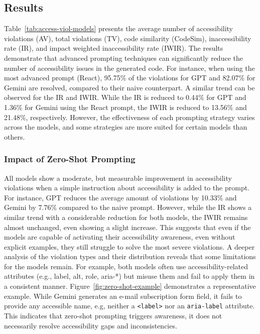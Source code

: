 \subsection{Results}
Table~\ref{tab:access-viol-models} presents the average number of accessibility 
violations (AV), total violations (TV), code similarity (CodeSim),
inaccessibility rate (IR), and impact weighted inaccessibility rate (IWIR).
The results demonstrate that advanced prompting techniques can significantly
reduce the number of accessibility issues in the generated code. For instance,
when using the most advanced prompt (React), 95.75\% of the violations for 
GPT and 82.07\% for Gemini are resolved, compared to their naive counterpart.
A similar trend can be observed for the IR and IWIR. While the 
IR is reduced to 0.44\% for GPT and 1.36\% for Gemini using the React 
prompt, the IWIR is reduced to 13.56\% and 21.48\%, respectively. However, 
the effectiveness of each prompting strategy varies across the models, and 
some strategies are more suited for certain models than others.


\begingroup
    
\endgroup

\subsubsection{Impact of Zero-Shot Prompting}
All models show a moderate, but measurable improvement in accessibility 
violations when a simple instruction about accessibility is added to 
the prompt. For instance, GPT reduces the average amount of 
violations by 10.33\% and Gemini by 7.76\% compared to the 
naive prompt. However, while the IR shows a similar trend with 
a considerable reduction for both models, the IWIR remains almost 
unchanged, even showing a slight increase. This suggests that even 
if the models are capable of activating their accessibility 
awareness, even without explicit examples, they still struggle to 
solve the most severe violations.\newline
A deeper analysis of the violation types and their distribution 
reveals that some limitations for the models remain. For example,
both models often use accessibility-related attributes (e.g., 
label, alt, role, aria-*) but misuse them and fail to apply them 
in a consistent manner. Figure~\ref{fig:zero-shot-example} demonstrates
a representative example. While Gemini generates an e-mail 
subscription form field, it fails to provide any accessible name,
e.g, neither a \texttt{<label>} nor an \texttt{aria-label} attribute.
This indicates that zero-shot prompting triggers awareness, it 
does not necessarily resolve accessibility gaps and inconsistencies.



